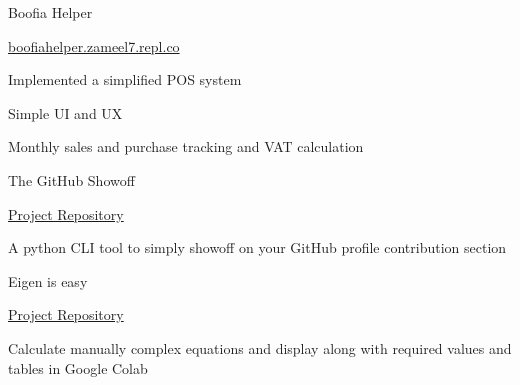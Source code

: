 \begin{cventries}
    \cventry
    {} %
    {Boofia Helper} %
    {} %
    {} %
    {
      \begin{cvitems} %
        \item {\hyperlink{boofiahelper.zameel7.repl.co}{boofiahelper.zameel7.repl.co}}
      	\item {Implemented a simplified POS system}
       \item {Simple UI and UX}
       \item {Monthly sales and purchase tracking and VAT calculation}
      \end{cvitems}
    }

    \cventry
    {} %
    {The GitHub Showoff} %
    {} %
    {} %
    {
      \begin{cvitems} %
        \item {\hyperlink{https://github.com/rabeeh-ta/the-github-showoff.git}{Project Repository}}
      	\item {A python CLI tool to simply showoff on your GitHub profile contribution section}
      \end{cvitems}
    }

    \cventry
    {} %
    {Eigen is easy} %
    {} %
    {} %
    {
      \begin{cvitems} %
        \item {\hyperlink{https://github.com/rabeeh-ta/eigen-is-easy.git}{Project Repository}}
      	\item {Calculate manually complex equations and display along with required values and tables in Google Colab}
      \end{cvitems}
    }
\end{cventries}